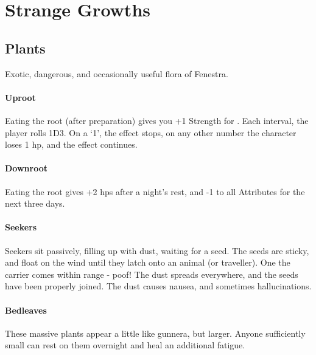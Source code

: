\chapter{Strange Growths}
\label{plants}

\section{Plants}

\begin{multicols}{2}

Exotic, dangerous, and occasionally useful flora of Fenestra.

\subsubsection{Uproot}
\label{uproot}

Eating the root (after preparation) gives you +1 Strength for .
Each \gls{interval}, the player rolls 1D3.
On a `1', the effect stops, on any other number the character loses 1 \gls{hp}, and the effect continues.

\subsubsection{Downroot}
\label{downroot}

Eating the root gives +2 \glspl{hp} after a night's rest, and -1 to all Attributes for the next three days.

\subsubsection{Seekers}
\label{seekers}

Seekers sit passively, filling up with dust, waiting for a seed.
The seeds are sticky, and float on the wind until they latch onto an animal (or traveller).
One the carrier comes within range - poof!
The dust spreads everywhere, and the seeds have been properly joined.
The dust causes nausea, and sometimes hallucinations.

\subsubsection{Bedleaves}
\label{bedleaves}

These massive plants appear a little like gunnera, but larger.
Anyone sufficiently small can rest on them overnight and heal an additional \gls{fatigue}.


\end{multicols}

